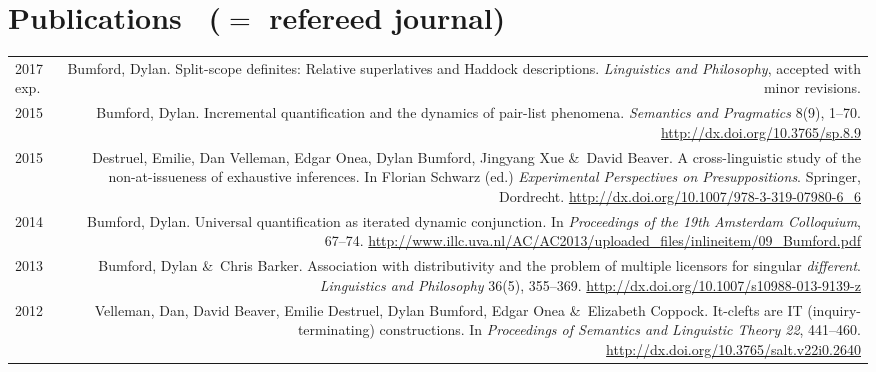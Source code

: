 \documentclass[12pt]{article}
\newcommand{\doi}[1]{\url{http://dx.doi.org/#1}}
\newcommand{\with}{\&}
\begin{document}
\section*{Publications \ \textrm{(\textdagger ${}={}$ refereed journal)}} 

\begin{longtable}{LR}
  2017 exp.
        & Bumford, Dylan. Split-scope definites: Relative superlatives and
          Haddock descriptions. \textit{Linguistics and Philosophy}, accepted
          with minor revisions.\\
  2015  & Bumford, Dylan. Incremental quantification and the dynamics of
          pair-list phenomena. \textit{Semantics and Pragmatics} 8(9), 1--70.
          \doi{10.3765/sp.8.9}\\
  2015  & Destruel, Emilie, Dan Velleman, Edgar Onea, Dylan Bumford, Jingyang Xue
          \with~David Beaver. A cross-linguistic study of the non-at-issueness
          of exhaustive inferences. In Florian Schwarz (ed.)
          \textit{Experimental Perspectives on Presuppositions}. Springer,
          Dordrecht.
          \doi{10.1007/978-3-319-07980-6_6}\\ %
  2014  & Bumford, Dylan. Universal quantification as iterated dynamic
          conjunction. In \textit{Proceedings of the 19th Amsterdam
          Colloquium}, 67--74.
          \url{http://www.illc.uva.nl/AC/AC2013/uploaded_files/inlineitem/09_Bumford.pdf}\\
  2013  & Bumford, Dylan \with~Chris Barker. Association with distributivity
          and the problem of multiple licensors for singular
          \textit{different}. \textit{Linguistics and Philosophy} 36(5),
          355--369.
          \doi{10.1007/s10988-013-9139-z}\\ %
  2012  & Velleman, Dan, David Beaver, Emilie Destruel, Dylan Bumford, Edgar
          Onea \with~Elizabeth Coppock. It-clefts are IT (inquiry-terminating)
          constructions. In \textit{Proceedings of Semantics and Linguistic
          Theory 22}, 441--460.
          \doi{10.3765/salt.v22i0.2640}
\end{longtable}
\end{document}
